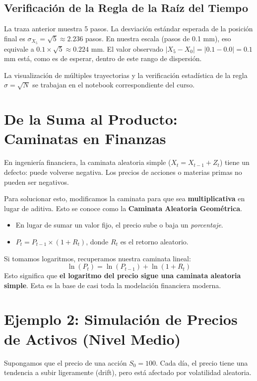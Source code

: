 \documentclass[11pt, letterpaper]{article}
\begin{document}
\subsection{Verificación de la Regla de la Raíz del Tiempo}

La traza anterior muestra 5 pasos. La desviación estándar esperada de la posición final es $\sigma_{X_5} = \sqrt{5} \approx 2.236$ pasos. En nuestra escala (pasos de 0.1 mm), eso equivale a $0.1 \times \sqrt{5} \approx 0.224$ mm. El valor observado $|X_5 - X_0| = |0.1 - 0.0| = 0.1$ mm está, como es de esperar, dentro de este rango de dispersión.

La visualización de múltiples trayectorias y la verificación estadística de la regla $\sigma = \sqrt{N}$ se trabajan en el notebook correspondiente del curso.

\section{De la Suma al Producto: Caminatas en Finanzas}

En ingeniería financiera, la caminata aleatoria simple ($X_t = X_{t-1} + Z_t$) tiene un defecto: puede volverse negativa. Los precios de acciones o materias primas no pueden ser negativos.

Para solucionar esto, modificamos la caminata para que sea \textbf{multiplicativa} en lugar de aditiva. Esto se conoce como la \textbf{Caminata Aleatoria Geométrica}.
\begin{itemize}
    \item En lugar de sumar un valor fijo, el precio sube o baja un \textit{porcentaje}.
    \item $P_t = P_{t-1} \times (1 + R_t)$, donde $R_t$ es el retorno aleatorio.
\end{itemize}

Si tomamos logaritmos, recuperamos nuestra caminata lineal:
$$ \ln(P_t) = \ln(P_{t-1}) + \ln(1 + R_t) $$
Esto significa que \textbf{el logaritmo del precio sigue una caminata aleatoria simple}. Esta es la base de casi toda la modelación financiera moderna.

\section{Ejemplo 2: Simulación de Precios de Activos (Nivel Medio)}

Supongamos que el precio de una acción $S_0 = 100$. Cada día, el precio tiene una tendencia a subir ligeramente (drift), pero está afectado por volatilidad aleatoria.
\end{document}
